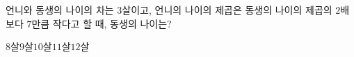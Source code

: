 언니와 동생의 나이의 차는 $3$살이고, 언니의 나이의 제곱은 동생의 나이의 제곱의 $2$배보다 $7$만큼 작다고 할 때, 동생의 나이는?
\begin{choices32}{$8$살}{$9$살}{$10$살}{$11$살}{$12$살}\end{choices32}
